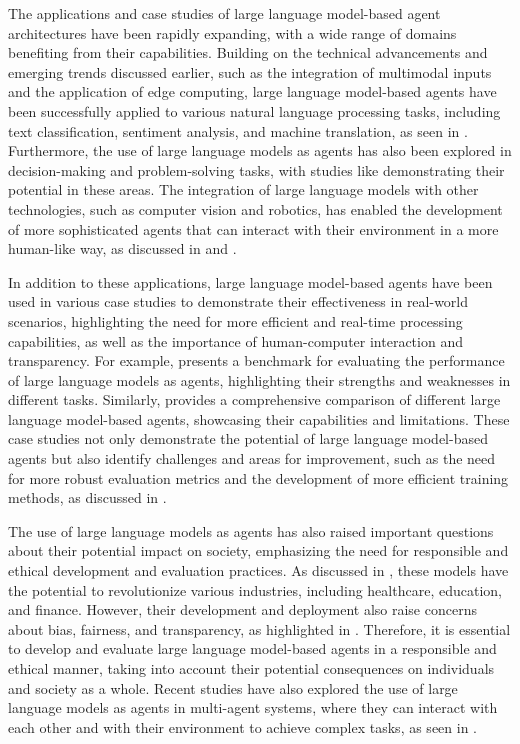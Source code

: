 \documentclass[11pt,a4paper]{article}
\begin{document}
The applications and case studies of large language model-based agent architectures have been rapidly expanding, with a wide range of domains benefiting from their capabilities. Building on the technical advancements and emerging trends discussed earlier, such as the integration of multimodal inputs and the application of edge computing, large language model-based agents have been successfully applied to various natural language processing tasks, including text classification, sentiment analysis, and machine translation, as seen in \cite{arxiv:2402.06196}. Furthermore, the use of large language models as agents has also been explored in decision-making and problem-solving tasks, with studies like \cite{arxiv:2309.02427} demonstrating their potential in these areas. The integration of large language models with other technologies, such as computer vision and robotics, has enabled the development of more sophisticated agents that can interact with their environment in a more human-like way, as discussed in \cite{doi:10.18653/v1/2023.acl-long.411} and \cite{doi:10.1109/iccv51070.2023.00788}.

In addition to these applications, large language model-based agents have been used in various case studies to demonstrate their effectiveness in real-world scenarios, highlighting the need for more efficient and real-time processing capabilities, as well as the importance of human-computer interaction and transparency. For example, \cite{arxiv:2308.03688} presents a benchmark for evaluating the performance of large language models as agents, highlighting their strengths and weaknesses in different tasks. Similarly, \cite{arxiv:2308.05960} provides a comprehensive comparison of different large language model-based agents, showcasing their capabilities and limitations. These case studies not only demonstrate the potential of large language model-based agents but also identify challenges and areas for improvement, such as the need for more robust evaluation metrics and the development of more efficient training methods, as discussed in \cite{arxiv:2312.00678}.

The use of large language models as agents has also raised important questions about their potential impact on society, emphasizing the need for responsible and ethical development and evaluation practices. As discussed in \cite{doi:10.3348/kjr.2023.0997}, these models have the potential to revolutionize various industries, including healthcare, education, and finance. However, their development and deployment also raise concerns about bias, fairness, and transparency, as highlighted in \cite{doi:10.1016/j.tics.2023.08.006}. Therefore, it is essential to develop and evaluate large language model-based agents in a responsible and ethical manner, taking into account their potential consequences on individuals and society as a whole. Recent studies have also explored the use of large language models as agents in multi-agent systems, where they can interact with each other and with their environment to achieve complex tasks, as seen in \cite{arxiv:2310.20151}.
\end{document}
